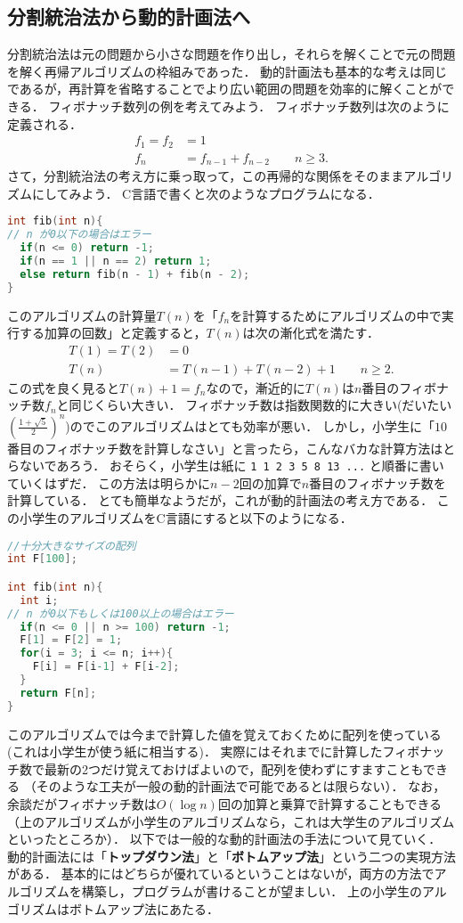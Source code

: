\documentclass[a4paper,twoside,onecolumn,openany,article]{memoir}
\theoremstyle{remark}
\begin{document}
\subsection{分割統治法から動的計画法へ}
分割統治法は元の問題から小さな問題を作り出し，それらを解くことで元の問題を解く再帰アルゴリズムの枠組みであった．
動的計画法も基本的な考えは同じであるが，再計算を省略することでより広い範囲の問題を効率的に解くことができる．
フィボナッチ数列の例を考えてみよう．
フィボナッチ数列は次のように定義される．
\begin{align*}
f_1=f_2&=1\\
f_n&=f_{n-1}+f_{n-2}\qquad n\ge 3.
\end{align*}
さて，分割統治法の考え方に乗っ取って，この再帰的な関係をそのままアルゴリズムにしてみよう．
C言語で書くと次のようなプログラムになる．
\begin{lstlisting}[basicstyle=\ttfamily\small,showstringspaces=false,language=C,frame=single]
int fib(int n){
// n が0以下の場合はエラー
  if(n <= 0) return -1;
  if(n == 1 || n == 2) return 1;
  else return fib(n - 1) + fib(n - 2);
}
\end{lstlisting}
このアルゴリズムの計算量$T(n)$を「$f_n$を計算するためにアルゴリズムの中で実行する加算の回数」と定義すると，$T(n)$は次の漸化式を満たす．
\begin{align*}
T(1)=T(2)&=0\\
T(n)&=T(n-1)+T(n-2) + 1\qquad n\ge 2.
\end{align*}
この式を良く見ると$T(n)+1=f_n$なので，漸近的に$T(n)$は$n$番目のフィボナッチ数$f_n$と同じくらい大きい．
フィボナッチ数は指数関数的に大きい(だいたい$\left(\frac{1+\sqrt{5}}2\right)^n$)のでこのアルゴリズムはとても効率が悪い．
しかし，小学生に「$10$番目のフィボナッチ数を計算しなさい」と言ったら，こんなバカな計算方法はとらないであろう．
おそらく，小学生は紙に \texttt{1  1  2  3 5 8 13 ...} と順番に書いていくはずだ．
この方法は明らかに$n-2$回の加算で$n$番目のフィボナッチ数を計算している．
とても簡単なようだが，これが動的計画法の考え方である．
この小学生のアルゴリズムをC言語にすると以下のようになる．
\begin{lstlisting}[basicstyle=\ttfamily\small,showstringspaces=false,language=C,frame=single]
//十分大きなサイズの配列
int F[100];

int fib(int n){
  int i;
// n が0以下もしくは100以上の場合はエラー
  if(n <= 0 || n >= 100) return -1;
  F[1] = F[2] = 1;
  for(i = 3; i <= n; i++){
    F[i] = F[i-1] + F[i-2];
  }
  return F[n];
}
\end{lstlisting}
このアルゴリズムでは今まで計算した値を覚えておくために配列を使っている(これは小学生が使う紙に相当する)．
実際にはそれまでに計算したフィボナッチ数で最新の2つだけ覚えておけばよいので，配列を使わずにすますこともできる
（そのような工夫が一般の動的計画法で可能であるとは限らない）．
なお，余談だがフィボナッチ数は$O(\log n)$回の加算と乗算で計算することもできる（上のアルゴリズムが小学生のアルゴリズムなら，これは大学生のアルゴリズムといったところか）．
以下では一般的な動的計画法の手法について見ていく．
動的計画法には「\textbf{トップダウン法}」と「\textbf{ボトムアップ法}」という二つの実現方法がある．
基本的にはどちらが優れているということはないが，両方の方法でアルゴリズムを構築し，プログラムが書けることが望ましい．
上の小学生のアルゴリズムはボトムアップ法にあたる．
\end{document}
